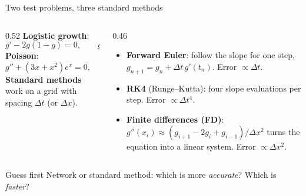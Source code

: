 \documentclass[10pt,aspectratio=169]{beamer}
\begin{document}
\begin{frame}{Two test problems, three standard methods}
\begin{columns}[T]
\begin{column}{0.52\textwidth}
\small
\textbf{Logistic growth}:
\[g'-2g(1-g)=0,\qquad g(0)=1.2.\]
\textbf{Poisson}:
\[g''+(3x+x^{2})e^{x}=0,\qquad g(0)=g(1)=0.\]
\textbf{Standard methods} work on a grid with spacing $\Delta t$ (or
$\Delta x$).
\end{column}
\begin{column}{0.46\textwidth}
\small
\begin{itemize}
  \item \textbf{Forward Euler}: follow the slope for one step,
        $g_{n+1}=g_{n}+\Delta t\,g'(t_{n})$.  Error $\propto\Delta t$.
  \item \textbf{RK4} (Runge--Kutta): four slope evaluations per step.
        Error $\propto\Delta t^{4}$.
  \item \textbf{Finite differences (FD)}:
        $g''(x_i)\approx(g_{i+1}-2g_{i}+g_{i-1})/\Delta x^{2}$ turns the
        equation into a linear system.  Error $\propto\Delta x^{2}$.
\end{itemize}
\end{column}
\end{columns}
\vfill
\pause
{}%
%
\begin{block}{Guess first}
Network or standard method: which is more \emph{accurate}?  Which is
\emph{faster}?
\end{block}
\end{frame}
\end{document}
